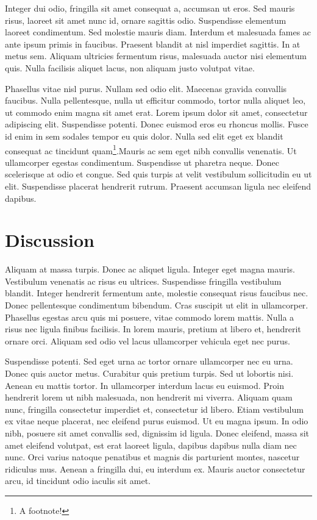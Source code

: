 \documentclass[
  12pt,
  a4paperpaper,
  a4paper]{scrreprt}
\begin{document}
Integer dui odio, fringilla sit amet consequat a, accumsan ut eros. Sed
mauris risus, laoreet sit amet nunc id, ornare sagittis odio.
Suspendisse elementum laoreet condimentum. Sed molestie mauris diam.
Interdum et malesuada fames ac ante ipsum primis in faucibus. Praesent
blandit at nisl imperdiet sagittis. In at metus sem. Aliquam ultricies
fermentum risus, malesuada auctor nisi elementum quis. Nulla facilisis
aliquet lacus, non aliquam justo volutpat vitae.

Phasellus vitae nisl purus. Nullam sed odio elit. Maecenas gravida
convallis faucibus. Nulla pellentesque, nulla ut efficitur commodo,
tortor nulla aliquet leo, ut commodo enim magna sit amet erat. Lorem
ipsum dolor sit amet, consectetur adipiscing elit. Suspendisse potenti.
Donec euismod eros eu rhoncus mollis. Fusce id enim in sem sodales
tempor eu quis dolor. Nulla sed elit eget ex blandit consequat ac
tincidunt quam\footnote{A footnote!}.Mauris ac sem eget nibh convallis
venenatis. Ut ullamcorper egestas condimentum. Suspendisse ut pharetra
neque. Donec scelerisque at odio et congue. Sed quis turpis at velit
vestibulum sollicitudin eu ut elit. Suspendisse placerat hendrerit
rutrum. Praesent accumsan ligula nec eleifend dapibus.


\chapter{Discussion}\label{discussion}

Aliquam at massa turpis. Donec ac aliquet ligula. Integer eget magna
mauris. Vestibulum venenatis ac risus eu ultrices. Suspendisse fringilla
vestibulum blandit. Integer hendrerit fermentum ante, molestie consequat
risus faucibus nec. Donec pellentesque condimentum bibendum. Cras
suscipit ut elit in ullamcorper. Phasellus egestas arcu quis mi posuere,
vitae commodo lorem mattis. Nulla a risus nec ligula finibus facilisis.
In lorem mauris, pretium at libero et, hendrerit ornare orci. Aliquam
sed odio vel lacus ullamcorper vehicula eget nec purus.

Suspendisse potenti. Sed eget urna ac tortor ornare ullamcorper nec eu
urna. Donec quis auctor metus. Curabitur quis pretium turpis. Sed ut
lobortis nisi. Aenean eu mattis tortor. In ullamcorper interdum lacus eu
euismod. Proin hendrerit lorem ut nibh malesuada, non hendrerit mi
viverra. Aliquam quam nunc, fringilla consectetur imperdiet et,
consectetur id libero. Etiam vestibulum ex vitae neque placerat, nec
eleifend purus euismod. Ut eu magna ipsum. In odio nibh, posuere sit
amet convallis sed, dignissim id ligula. Donec eleifend, massa sit amet
eleifend volutpat, est erat laoreet ligula, dapibus dapibus nulla diam
nec nunc. Orci varius natoque penatibus et magnis dis parturient montes,
nascetur ridiculus mus. Aenean a fringilla dui, eu interdum ex. Mauris
auctor consectetur arcu, id tincidunt odio iaculis sit amet.
\end{document}
